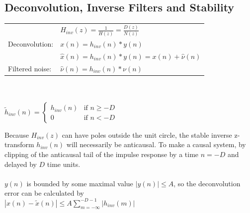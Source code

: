 \subsection{Deconvolution, Inverse Filters and Stability }
\begin{multicols}{2}
	\begin{tabular}{ll}
	  & $H_{inv}(z) = \frac{1}{H(z)} = \frac{D(z)}{N(z)}$ \\
	  Deconvolution: &  $x(n) = h_{inv}(n) * y(n)$ \\
	  & $\hat{x}(n) = h_{inv}(n) * y(n) = x(n) + \hat{\nu}(n)$ \\
	  Filtered noise: & $\hat{\nu}(n) = h_{inv}(n) * \nu (n)$
	\end{tabular}\\ \\
	
	$\tilde{h}_{inv}(n) = \left\lbrace\begin{matrix}
    h_{inv}(n) & \text{if } n \geq -D \\
    0 & \text{if } n < -D
  \end{matrix}\right.$ \\

\columnbreak

	Because $H_{inv}(z)$ can have poles outside the unit circle, the stable inverse z-transform $h_{inv}(n)$ will
	necessarily be anticausal. To make a causal system, by clipping of the anticausal tail of the impulse response by a 
	time $n = -D$ and delayed by $D$ time units.\\ \\
	
	$y(n)$ is bounded by some maximal value $|y(n)| \leq A$, so the deconvolution error can be calculated by\\
	$|x(n) - \tilde{x}(n)| \leq A \sum\limits_{m=-\infty}^{-D-1} |h_{inv}(m)|$	
	
\end{multicols}




